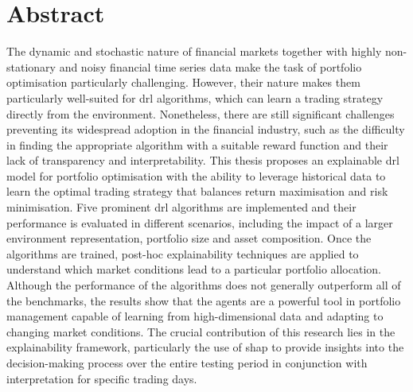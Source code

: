 \chapter*{Abstract}

The dynamic and stochastic nature of financial markets together with highly non-stationary and noisy financial time series data make the task of portfolio optimisation particularly challenging. However, their nature makes them particularly well-suited for \acrfull{drl} algorithms, which can learn a trading strategy directly from the environment. Nonetheless, there are still significant challenges preventing its widespread adoption in the financial industry, such as the difficulty in finding the appropriate algorithm with a suitable reward function and their lack of transparency and interpretability. This thesis proposes an explainable \acrshort{drl} model for portfolio optimisation with the ability to leverage historical data to learn the optimal trading strategy that balances return maximisation and risk minimisation. Five prominent \acrshort{drl} algorithms are implemented and their performance is evaluated in different scenarios, including the impact of a larger environment representation, portfolio size and asset composition. Once the algorithms are trained, post-hoc explainability techniques are applied to understand which market conditions lead to a particular portfolio allocation. Although the performance of the algorithms does not generally outperform all of the benchmarks, the results show that the agents are a powerful tool in portfolio management capable of learning from high-dimensional data and adapting to changing market conditions. The crucial contribution of this research lies in the explainability framework, particularly the use of \acrfull{shap} to provide insights into the decision-making process over the entire testing period in conjunction with interpretation for specific trading days.  
